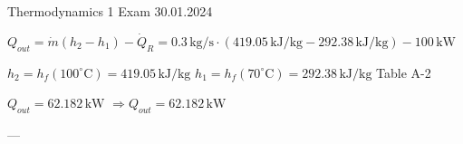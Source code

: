 Thermodynamics 1 Exam  
30.01.2024  

\( Q_{out} = \dot{m} (h_2 - h_1) - \dot{Q}_R = 0.3 \, \text{kg/s} \cdot (419.05 \, \text{kJ/kg} - 292.38 \, \text{kJ/kg}) - 100 \, \text{kW} \)  

\( h_2 = h_f (100^\circ \text{C}) = 419.05 \, \text{kJ/kg} \)  
\( h_1 = h_f (70^\circ \text{C}) = 292.38 \, \text{kJ/kg} \)  
Table A-2  

\( Q_{out} = 62.182 \, \text{kW} \)  
\( \Rightarrow Q_{out} = 62.182 \, \text{kW} \)  

---